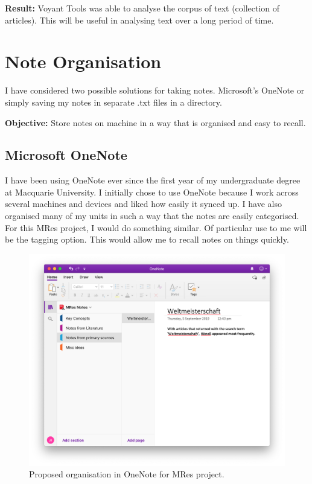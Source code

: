 \documentclass{article}
\begin{document}
\textbf{Result:} Voyant Tools was able to analyse the corpus of text (collection of articles). This will be useful in analysing text over a long period of time.

\newpage
\section*{Note Organisation}

I have considered two possible solutions for taking notes. Microsoft's OneNote or simply saving my notes in separate .txt files in a directory.

\textbf{Objective:} Store notes on machine in a way that is organised and easy to recall.

\subsection*{Microsoft OneNote}

I have been using OneNote ever since the first year of my undergraduate degree at Macquarie University. I initially chose to use OneNote because I work across several machines and devices and liked how easily it synced up. I have also organised many of my units in such a way that the notes are easily categorised. For this MRes project, I would do something similar. Of particular use to me will be the tagging option. This would allow me to recall notes on things quickly.

\begin{figure}[h!]
    \centering
    \includegraphics[width=\textwidth]{onenote.png}
    \caption{Proposed organisation in OneNote for MRes project.}
    \label{fig:my_label}
\end{figure}
\end{document}
